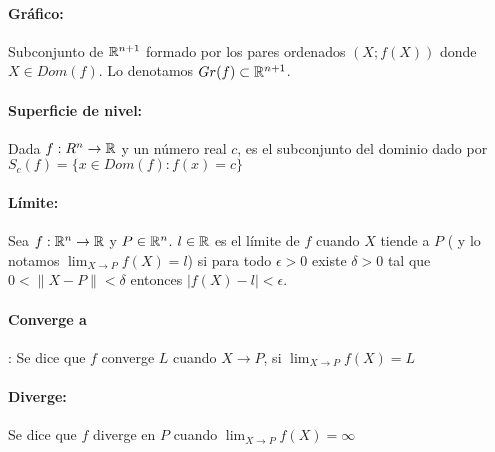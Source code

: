 \paragraph{Gráfico: } Subconjunto de $\mathbb{R}^{n+1}$ formado por los pares ordenados $(X; f(X))$ donde $X\in Dom(f)$. Lo denotamos $Gr(f)\subset\mathbb{R}^{n+1}$.
\paragraph{Superficie de nivel:} Dada $f : R^n\rightarrow \mathbb{R}$ y un número real $c$, es el subconjunto del dominio dado por $S_c(f) = \{x\in Dom(f) : f(x) = c\}$
\paragraph{Límite:} Sea $f : \mathbb{R}^n\rightarrow \mathbb{R}$ y $P\in\mathbb{R}^n$. $l\in\mathbb{R}$ es el límite de $f$ cuando $X$ tiende a $P$ ( y lo notamos $\lim_{X\rightarrow P} f(X) = l$) si para todo $\epsilon > 0$ existe $\delta > 0$ tal que $0 < \|X-P\| < \delta$ entonces $|f(X) - l| < \epsilon$.

\paragraph{Converge a}: Se dice que $f$ converge $L$ cuando $X\to P$, si $\lim_{X\to P}\limits f(X) = L$

\paragraph{Diverge:} Se dice que $f$ diverge en $P$ cuando $\lim_{X\to P}\limits f(X) = \infty$ 

